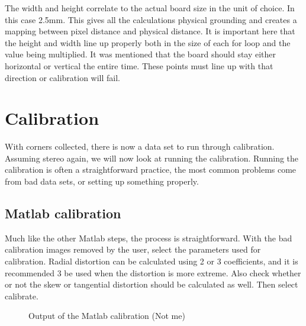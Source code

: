 \documentclass{article}
\begin{document}
The width and height correlate to the actual board size in the unit of choice. In this case 2.5mm. This gives all the calculations physical grounding and creates a mapping between pixel distance and physical distance. It is important here that the height and width line up properly both in the size of each for loop and the value being multiplied. It was mentioned that the board should stay either horizontal or vertical the entire time. These points must line up with that direction or calibration will fail.

\section{Calibration}

With corners collected, there is now a data set to run through calibration. Assuming stereo again, we will now look at running the calibration. Running the calibration is often a straightforward practice, the most common problems come from bad data sets, or setting up something properly. 

\subsection{Matlab calibration}

Much like the other Matlab steps, the process is straightforward. With the bad calibration images removed by the user, select the parameters used for calibration. Radial distortion can be calculated using 2 or 3 coefficients, and it is recommended 3 be used when the distortion is more extreme. Also check whether or not the skew or tangential distortion should be calculated as well. Then select calibrate. 

\begin{figure}[h]
	\centering
	\caption{Output of the Matlab calibration (Not me)}
	\label{fig:matlabcal}
\end{figure}
\end{document}
